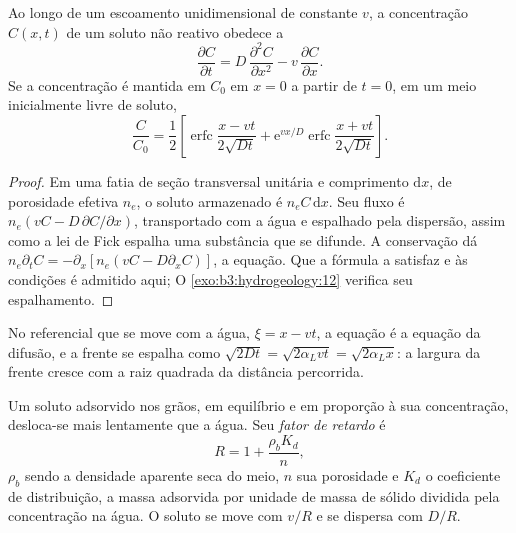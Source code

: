\begin{theorem}\label{thm:b3:hydrogeology:ade}
Ao longo de um escoamento unidimensional de  constante $v$, a
concentração $C(x, t)$ de um soluto não reativo obedece a
\[
\frac{\partial C}{\partial t} = D\,\frac{\partial^2C}{\partial x^2} -
v\,\frac{\partial C}{\partial x} .
\]
Se a concentração é mantida em $C_0$ em $x = 0$ a partir de $t = 0$, em um meio
inicialmente livre de soluto,
\[
\frac{C}{C_0} = \frac12\left[\operatorname{erfc}\frac{x - vt}{2\sqrt{Dt}} +
\mathrm e^{vx/D}\operatorname{erfc}\frac{x + vt}{2\sqrt{Dt}}\right] .
\]
\end{theorem}

\begin{proof}
Em uma fatia de seção transversal unitária e comprimento $\mathrm dx$, de porosidade
efetiva $n_e$, o soluto armazenado é $n_eC\,\mathrm dx$. Seu fluxo é
$n_e(vC - D\,\partial C/\partial x)$, transportado com a água e espalhado pela
dispersão, assim como a lei de Fick espalha uma substância que se difunde. A conservação dá
$n_e\partial_tC = -\partial_x[n_e(vC - D\partial_xC)]$, a equação. Que
a fórmula a satisfaz e às condições é admitido aqui;
O \cref{exo:b3:hydrogeology:12} verifica seu espalhamento.
\end{proof}

No referencial que se move com a água, $\xi = x - vt$, a equação é a
equação da difusão, e a frente se espalha como $\sqrt{2Dt} = \sqrt{2\alpha_L
vt} = \sqrt{2\alpha_Lx}$: a largura da frente cresce com a raiz quadrada da
distância percorrida.

\begin{definition}\label{def:b3:hydrogeology:retardation}
Um soluto adsorvido nos grãos, em equilíbrio e em proporção à sua
concentração, desloca-se mais lentamente que a água. Seu
\emph{fator de retardo} é
\[
R = 1 + \frac{\rho_bK_d}{n} ,
\]
$\rho_b$ sendo a densidade aparente seca do meio, $n$ sua porosidade e
$K_d$ o coeficiente de distribuição, a massa adsorvida por unidade de massa de
sólido dividida pela concentração na água. O soluto se move com $v/R$
e se dispersa com $D/R$.
\end{definition}

